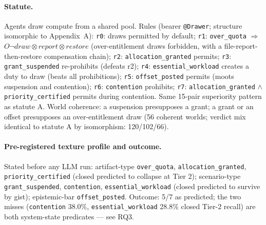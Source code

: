 \paragraph{Statute.} Agents draw compute from a shared pool. Rules
(bearer \texttt{@Drawer}; structure isomorphic to Appendix~A):
\texttt{r0}: draws permitted by default; \texttt{r1}:
\texttt{over\_quota} $\Rightarrow$ $O\neg draw \otimes report \otimes
restore$ (over-entitlement draws forbidden, with a file-report-then-restore
compensation chain); \texttt{r2}: \texttt{allocation\_granted} permits;
\texttt{r3}: \texttt{grant\_suspended} re-prohibits (defeats r2);
\texttt{r4}: \texttt{essential\_workload} creates a duty to draw (beats all
prohibitions); \texttt{r5}: \texttt{offset\_posted} permits (moots
suspension and contention); \texttt{r6}: \texttt{contention} prohibits;
\texttt{r7}: \texttt{allocation\_granted} $\wedge$
\texttt{priority\_certified} permits during contention. Same 15-pair
superiority pattern as statute A. World coherence: a suspension presupposes
a grant; a grant or an offset presupposes an over-entitlement draw (56
coherent worlds; verdict mix identical to statute A by isomorphism:
120/102/66).

\paragraph{Pre-registered texture profile and outcome.} Stated before any
LLM run: artifact-type \texttt{over\_quota}, \texttt{allocation\_granted},
\texttt{priority\_certified} (closed predicted to collapse at Tier 2);
scenario-type \texttt{grant\_suspended}, \texttt{contention},
\texttt{essential\_workload} (closed predicted to survive by gist);
epistemic-bar \texttt{offset\_posted}. Outcome: 5/7 as predicted; the two
misses (\texttt{contention} 38.0\%, \texttt{essential\_workload} 28.8\%
closed Tier-2 recall) are both system-state predicates --- see RQ3.


